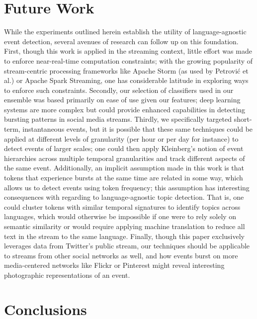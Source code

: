 \documentclass{acm_proc_article-sp}
\begin{document}
\section{Future Work}
\label{sect:future}

While the experiments outlined herein establish the utility of language-agnostic event detection, several avenues of research can follow up on this foundation.
First, though this work is applied in the streaming context, little effort was made to enforce near-real-time computation constraints; with the growing popularity of stream-centric processing frameworks like Apache Storm (as used by Petrovi\'{c} et al.) or Apache Spark Streaming, one has considerable latitude in exploring ways to enforce such constraints.
Secondly, our selection of classifiers used in our ensemble was based primarily on ease of use given our features; deep learning systems are more complex but could provide enhanced capabilities in detecting bursting patterns in social media streams.
Thirdly, we specifically targeted short-term, instantaneous events, but it is possible that these same techniques could be applied at different levels of granularity (per hour or per day for instance) to detect events of larger scales; one could then apply Kleinberg's notion of event hierarchies across multiple temporal granularities and track different aspects of the same event.
Additionally, an implicit assumption made in this work is that tokens that experience bursts at the same time are related in some way, which allows us to detect events using token frequency; this assumption has interesting consequences with regarding to language-agnostic topic detection.
That is, one could cluster tokens with similar temporal signatures to identify topics across languages, which would otherwise be impossible if one were to rely solely on semantic similarity or would require applying machine translation to reduce all text in the stream to the same language.
Finally, though this paper exclusively leverages data from Twitter's public stream, our techniques should be applicable to streams from other social networks as well, and how events burst on more media-centered networks like Flickr or Pinterest might reveal interesting photographic representations of an event.

\section{Conclusions}
\label{sect:conlusions}
\end{document}
